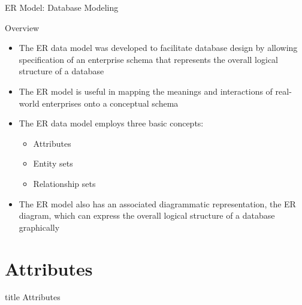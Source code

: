 \documentclass[aspectratio=169, xcolor=dvipsnames]{beamer}
\begin{document}
\begin{frame}{ER Model: Database Modeling}
    \begin{block}{Overview}
        \begin{itemize}[<+->]
            \item The ER data model was developed to facilitate database design by allowing specification of an enterprise schema that represents the overall logical structure of a database
            \item The ER model is useful in mapping the meanings and interactions of real-world enterprises onto a conceptual schema
            \item The ER data model employs three basic concepts:
            \begin{itemize}
                \item[$\triangleright$] Attributes
                \item[$\triangleright$] Entity sets
                \item[$\triangleright$] Relationship sets
            \end{itemize}
            \item The ER model also has an associated diagrammatic representation, the ER diagram, which can express the overall logical structure of a database graphically
        \end{itemize}
    \end{block}
\end{frame}

\section{Attributes}
\begin{frame}
  \vfill
  \centering
  \begin{beamercolorbox}[sep=8pt,center,shadow=true,rounded=true]{title}
    Attributes\par%
  \end{beamercolorbox}
  \vfill
\end{frame}
\end{document}
